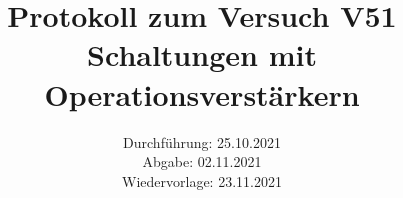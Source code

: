 \titlehead{\texttt{[image: ressources/logo.jpg]}}
\title{Protokoll zum Versuch V51 \\ Schaltungen mit Operationsverstärkern}
\date{Durchführung: 25.10.2021 \\ Abgabe: 02.11.2021 \\ Wiedervorlage: 23.11.2021}

